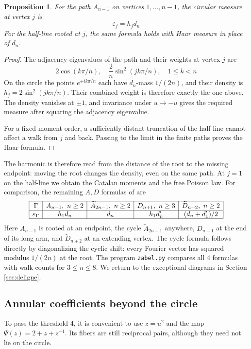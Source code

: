 \documentclass[11pt,reqno]{amsart}
\newtheorem{prop}[thm]{Proposition}
\theoremstyle{definition}
\numberwithin{equation}{section}
\begin{document}
\begin{prop}\label{prop:path}
For the path $A_{n-1}$ on vertices $1,\ldots,n-1$, the circular measure at vertex $j$ is
$$\varepsilon_j=h_jd_n$$
For the half-line rooted at $j$, the same formula holds with Haar measure in place of $d_n$.
\end{prop}
\begin{proof}
The adjacency eigenvalues of the path and their weights at vertex $j$ are
$$2\cos(k\pi/n),\quad \frac2n\sin^2(jk\pi/n),\quad 1\leq k<n$$
On the circle the points $e^{\pm ik\pi/n}$ each have $d_n$-mass $1/(2n)$, and their density is $h_j=2\sin^2(jk\pi/n)$. Their combined weight is therefore exactly the one above. The density vanishes at $\pm1$, and invariance under $u\to-u$ gives the required measure after squaring the adjacency eigenvalue.

For a fixed moment order, a sufficiently distant truncation of the half-line cannot affect a walk from $j$ and back. Passing to the limit in the finite paths proves the Haar formula.
\end{proof}

The harmonic is therefore read from the distance of the root to the missing endpoint: moving the root changes the density, even on the same path. At $j=1$ on the half-line we obtain the Catalan moments and the free Poisson law. For comparison, the remaining $A,D$ formulas of \cite[Theorems 2.1, 3.1, 3.2 and 4.1]{BB07} are
$$\begin{array}{|c|c|c|c|c|}\hline
\Gamma&A_{n-1},\ n\geq2&\widetilde A_{2n-1},\ n\geq2&D_{n+1},\ n\geq3&\widetilde D_{n+2},\ n\geq2\\\hline
\varepsilon_\Gamma&h_1d_n&d_n&h_1d'_n&(d_n+d'_1)/2\\\hline
\end{array}$$
Here $A_{n-1}$ is rooted at an endpoint, the cycle $\widetilde A_{2n-1}$ anywhere, $D_{n+1}$ at the end of its long arm, and $\widetilde D_{n+2}$ at an extending vertex. The cycle formula follows directly by diagonalizing the cyclic shift: every Fourier vector has squared modulus $1/(2n)$ at the root. The program \texttt{zabel.py} compares all 4 formulas with walk counts for $3\leq n\leq8$. We return to the exceptional diagrams in Section \ref{sec:deligne}.

\subsection{Annular coefficients beyond the circle}

To pass the threshold 4, it is convenient to use $z=u^2$ and the map $\Psi(z)=2+z+z^{-1}$. Its fibers are still reciprocal pairs, although they need not lie on the circle.
\end{document}
